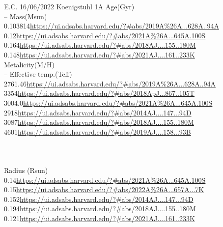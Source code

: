 E.C. 16/06/2022
Koenigstuhl 1A
Age(Gyr)\\
--
Mass(Msun)\\
0.103814\url{https://ui.adsabs.harvard.edu/?#abs/2019A%26A...628A..94A}\\
0.12\url{https://ui.adsabs.harvard.edu/?#abs/2021A%26A...645A.100S}\\
0.164\url{https://ui.adsabs.harvard.edu/?#abs/2018AJ....155..180M}\\
0.148\url{https://ui.adsabs.harvard.edu/?#abs/2021AJ....161..233K}\\
Metalicity(M/H)\\
--
Effective temp.(Teff)\\
2761.46\url{https://ui.adsabs.harvard.edu/?#abs/2019A%26A...628A..94A}\\
3354\url{https://ui.adsabs.harvard.edu/?#abs/2018ApJ...867..105T}\\
3004.0\url{https://ui.adsabs.harvard.edu/?#abs/2021A%26A...645A.100S}\\
2918\url{https://ui.adsabs.harvard.edu/?#abs/2014AJ....147...94D}\\
3087\url{https://ui.adsabs.harvard.edu/?#abs/2018AJ....155..180M}\\
4601\url{https://ui.adsabs.harvard.edu/?#abs/2019AJ....158...93B}\\
\url{}\\
\url{}\\
\url{}\\
Radius (Rsun)\\
0.14\url{https://ui.adsabs.harvard.edu/?#abs/2021A%26A...645A.100S}\\
0.15\url{https://ui.adsabs.harvard.edu/?#abs/2022A%26A...657A...7K}\\
0.152\url{https://ui.adsabs.harvard.edu/?#abs/2014AJ....147...94D}\\
0.194\url{https://ui.adsabs.harvard.edu/?#abs/2018AJ....155..180M}\\
0.121\url{https://ui.adsabs.harvard.edu/?#abs/2021AJ....161..233K}\\

